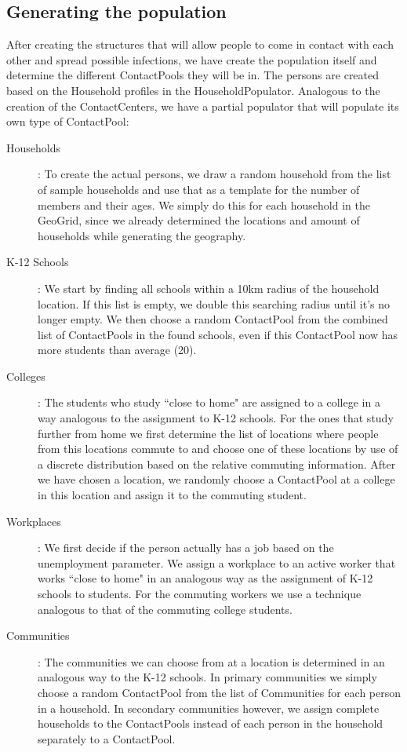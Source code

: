 \subsection{Generating the population}
\label{subsection:genpop}
After creating the structures that will allow people to come in contact with each other and spread possible infections, we have create the population itself and determine the different ContactPools they will be in.
The persons are created based on the Household profiles in the HouseholdPopulator.
Analogous to the creation of the ContactCenters, we have a partial populator that will populate its own type of ContactPool:

\begin{description}
    \item[Households]:
        To create the actual persons, we draw a random household from the list of sample households and use that as a template for the number of members and their ages.
        We simply do this for each household in the GeoGrid, since we already determined the locations and amount of households while generating the geography.
    \item[K-12 Schools]:
        We start by finding all schools within a 10km radius of the household location. If this list is empty, we double this searching radius until it's no longer empty.
        We then choose a random ContactPool from the combined list of ContactPools in the found schools, even if this ContactPool now has more students than average (20).
    \item[Colleges]:
        The students who study ``close to home" are assigned to a college in a way analogous to the assignment to K-12 schools.
        For the ones that study further from home we first determine the list of locations where people from this locations commute to and choose one of these locations by use of a discrete distribution based on the relative commuting information.
        After we have chosen a location, we randomly choose a ContactPool at a college in this location and assign it to the commuting student.
    \item[Workplaces]:
        We first decide if the person actually has a job based on the unemployment parameter.
        We assign a workplace to an active worker that works ``close to home" in an analogous way as the assignment of K-12 schools to students.
        For the commuting workers we use a technique analogous to that of the commuting college students.
    \item[Communities]:
        The communities we can choose from at a location is determined in an analogous way to the K-12 schools.
        In primary communities we simply choose a random ContactPool from the list of Communities for each person in a household.
        In secondary communities however, we assign complete households to the ContactPools instead of each person in the household separately to a ContactPool.

\end{description}

